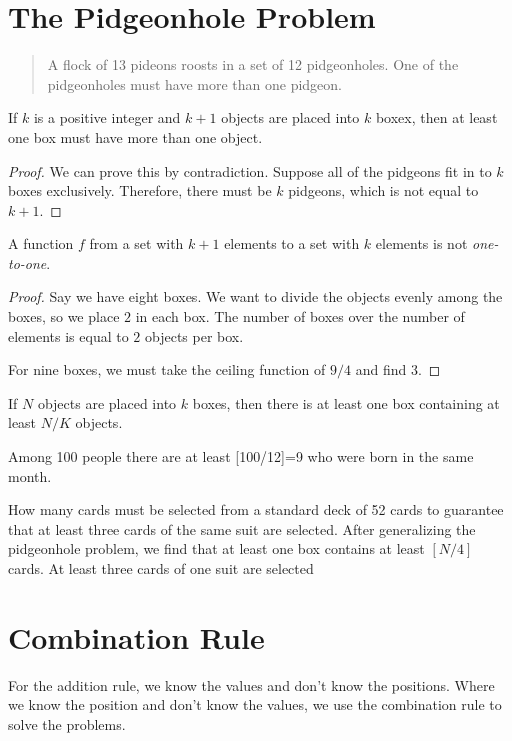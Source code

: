 \section{The Pidgeonhole Problem}
\begin{quote}
  A flock of 13 pideons roosts in a set of 12 pidgeonholes. One of the
  pidgeonholes must have more than one pidgeon.
\end{quote}
If $k$ is a positive integer and $k+1$ objects are placed into $k$ boxex, then
at least one box must have more than one object.
\begin{proof}
  We can prove this by contradiction. Suppose all of the pidgeons fit in to $k$
  boxes exclusively. Therefore, there must be $k$ pidgeons, which is not equal
  to $k+1$.
\end{proof}
\begin{corollary}
  A function $f$ from a set with $k+1$ elements to a set with $k$ elements is
  not \emph{one-to-one}.
  \begin{proof}
    Say we have eight boxes. We want to divide the objects evenly among the
    boxes, so we place $2$ in each box. The number of boxes over the number of
    elements is equal to $2$ objects per box.

    For nine boxes, we must take the ceiling function of $9/4$ and find 3.
  \end{proof}
\end{corollary}
\begin{theorem}
  \label{th:pidgeonhole}
  If $N$ objects are placed into $k$ boxes, then there is at least one box
  containing at least $N/K$ objects.
\end{theorem}
\begin{ex}
  Among 100 people there are at least [100/12]=9 who were born in the same
  month.
\end{ex}
\begin{ex}
  How many cards must be selected from a standard deck of 52 cards to guarantee
  that at least three cards of the same suit are selected. After generalizing
  the pidgeonhole problem, we find that at least one box contains at least
  $[N/4]$ cards. At least three cards of one suit are selected 
\end{ex}
\section{Combination Rule}

For the addition rule, we know the values and don't know the positions.
Where we know the position and don't know the values, we use the combination
rule to solve the problems.

